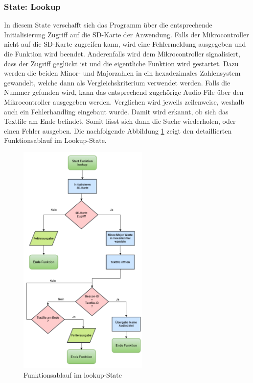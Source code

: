 \subsubsection*{State: Lookup}
In diesem State verschafft sich das Programm über die entsprechende Initialisierung Zugriff auf die SD-Karte der Anwendung. Falls der Mikrocontroller nicht auf die SD-Karte zugreifen kann, wird eine Fehlermeldung ausgegeben und die Funktion wird beendet. Anderenfalls wird dem Mikrocontroller signalisiert, dass der Zugriff geglückt ist und die eigentliche Funktion wird gestartet. Dazu werden die beiden Minor- und Majorzahlen in ein hexadezimales Zahlensystem gewandelt, welche dann als Vergleichskriterium verwendet werden. Falls die Nummer gefunden wird, kann das entsprechend zugehörige Audio-File über den Mikrocontroller ausgegeben werden. Verglichen wird jeweils zeilenweise, weshalb auch ein Fehlerhandling eingebaut wurde. Damit wird erkannt, ob sich das Textfile am Ende befindet. Somit lässt sich dann die Suche wiederholen, oder einen Fehler ausgeben. Die nachfolgende Abbildung \ref{fig:lookupState} zeigt den detaillierten Funktionsablauf im Lookup-State.

\begin{figure}[htbp!!!!]
	\centering
	\includegraphics[width=0.57\textwidth]{Data/lookup_picture}
	\caption[Statemachine: lookup]{Funktionsablauf im lookup-State}
	\label{fig:lookupState}
\end{figure} 

